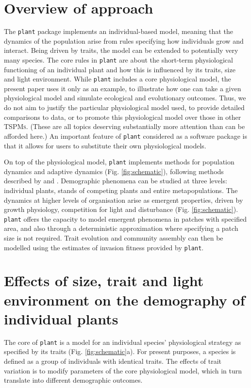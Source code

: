 \documentclass[a4paper,11pt]{article}
\newcommand{\plant}{\texttt{plant}}
\begin{document}
\section{Overview of approach}

The {\plant} package implements an individual-based model, meaning that the dynamics of the
population arise from rules specifying how individuals grow and interact.
Being driven by traits, the model can be extended to potentially very many species. The
core rules in {\plant} are about the short-term physiological
functioning of an individual plant and how this is influenced by its
traits, size and light environment. While {\plant} includes a core physiological model, the present paper uses it only as an example, to illustrate how one can take a given physiological model and simulate ecological and evolutionary outcomes. Thus, we do not aim to justify the particular physiological model used, to provide detailed
comparisons to data, or to promote this physiological model over those
in other \textsc{TSPMs}. (These are all topics deserving substantially
more attention than can be afforded here.)
An important feature of {\plant} considered as a software package is that it allows for users to substitute their own physiological models.

On top of the physiological model, {\plant} implements methods for
population dynamics and adaptive dynamics (Fig. \ref{fig:schematic}), following methods
described by \citet{Falster-2011} and \citet{Falster-2015}. Demographic
phenomena can be studied at three levels: individual plants, stands of
competing plants and entire metapopulations. The dynamics at higher
levels of organisation arise as emergent properties, driven by growth
physiology, competition for light and disturbance (Fig. \ref{fig:schematic}).
{\plant} offers the capacity to model emergent phenomena in patches with
specified area, and also through a deterministic approximation
where specifying a patch size is not required. Trait evolution and community
assembly can then be modelled using the estimates of invasion fitness
provided by {\plant}.

\section{Effects of size, trait and light environment on the demography of individual plants}

The core of {\plant} is a model for an individual species' physiological
strategy as specified by its traits (Fig. \ref{fig:schematic}a). For
present purposes, a species is defined as a group of individuals with identical
traits. The effects of trait variation is to modify parameters of the core
physiological model, which in turn translate into different demographic outcomes.
\end{document}
